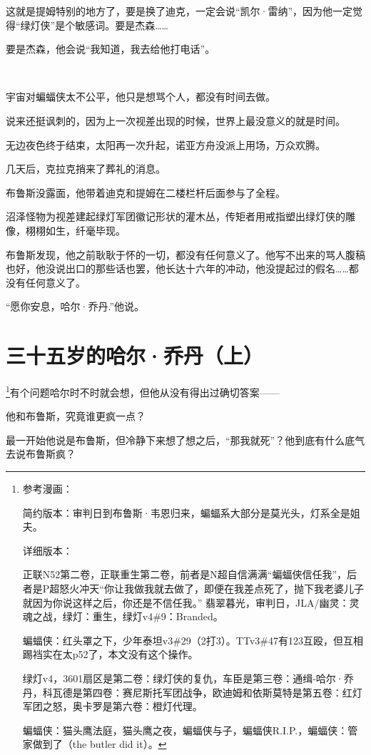 \documentclass[../main]{subfiles}
\begin{document}
这就是提姆特别的地方了，要是换了迪克，一定会说“凯尔·雷纳”，因为他一定觉得“绿灯侠”是个敏感词。要是杰森……

要是杰森，他会说“我知道，我去给他打电话”。

~\

宇宙对蝙蝠侠太不公平，他只是想骂个人，都没有时间去做。

说来还挺讽刺的，因为上一次视差出现的时候，世界上最没意义的就是时间。

无边夜色终于结束，太阳再一次升起，诺亚方舟没派上用场，万众欢腾。

几天后，克拉克捎来了葬礼的消息。

布鲁斯没露面，他带着迪克和提姆在二楼栏杆后面参与了全程。

沼泽怪物为视差建起绿灯军团徽记形状的灌木丛，传矩者用戒指塑出绿灯侠的雕像，栩栩如生，纤毫毕现。

布鲁斯发现，他之前耿耿于怀的一切，都没有任何意义了。他写不出来的骂人腹稿也好，他没说出口的那些话也罢，他长达十六年的冲动，他没提起过的假名……都没有任何意义了。

“愿你安息，哈尔·乔丹.”他说。

\section[三十五岁的哈尔·乔丹]{三十五岁的哈尔·乔丹（上）}

\footnote[1]{参考漫画：

    简约版本：审判日到布鲁斯·韦恩归来，蝙蝠系大部分是莫光头，灯系全是姐夫。

    详细版本：

    正联N52第二卷，正联重生第二卷，前者是N超自信满满“蝙蝠侠信任我”，后者是P超怒火冲天“你让我做我就去做了，即便在我差点死了，抛下我老婆儿子就因为你说这样之后，你还是不信任我。”
    翡翠暮光，审判日，JLA/幽灵：灵魂之战，绿灯：重生，绿灯v4\#9：Branded。

    蝙蝠侠：红头罩之下，少年泰坦v3\#29（2打3）。TTv3\#47有123互殴，但互相踢裆实在太p52了，本文没有这个操作。

    绿灯v4，3601扇区是第二卷：绿灯侠的复仇，车臣是第三卷：通缉-哈尔·乔丹，科瓦德是第四卷：赛尼斯托军团战争，欧迪姆和依斯莫特是第五卷：红灯军团之怒，奥卡罗是第六卷：橙灯代理。

    蝙蝠侠：猫头鹰法庭，猫头鹰之夜，蝙蝠侠与子，蝙蝠侠R.I.P.，蝙蝠侠：管家做到了（the butler did it）。}有个问题哈尔时不时就会想，但他从没有得出过确切答案——

他和布鲁斯，究竟谁更疯一点？

最一开始他说是布鲁斯，但冷静下来想了想之后，“那我就死”？他到底有什么底气去说布鲁斯疯？
\end{document}
